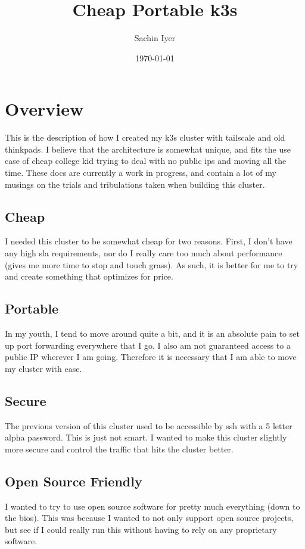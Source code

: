 \documentclass[12pt]{article}
\title{Cheap Portable k3s}
\author{Sachin Iyer}
\date{\today}
\begin{document}
\maketitle
\section{Overview}
This is the description of how I created my k3s cluster with tailscale and old thinkpads. I believe that the architecture is somewhat unique, and fits the use case of cheap college kid trying to deal with no public ips and moving all the time. These docs are currently a work in progress, and contain a lot of my musings on the trials and tribulations taken when building this cluster.

\subsection{Cheap}
I needed this cluster to be somewhat cheap for two reasons. First, I don't have any high sla requirements, nor do I really care too much about performance (gives me more time to stop and touch grass). As such, it is better for me to try and create something that optimizes for price.

\subsection{Portable}
In my youth, I tend to move around quite a bit, and it is an absolute pain to set up port forwarding everywhere that I go. I also am not guaranteed access to a public IP wherever I am going. Therefore it is necessary that I am able to move my cluster with ease.

\subsection{Secure}
The previous version of this cluster used to be accessible by ssh with a 5 letter alpha password. This is just not smart. I wanted to make this cluster slightly more secure and control the traffic that hits the cluster better.

\subsection{Open Source Friendly}
I wanted to try to use open source software for pretty much everything (down to the bios). This was because I wanted to not only support open source projects, but see if I could really run this without having to rely on any proprietary software.
\end{document}

